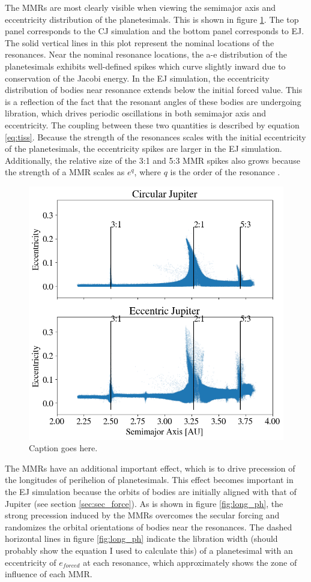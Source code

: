 \documentclass[onecolumn]{aastex63}
\begin{document}
The MMRs are most clearly visible when viewing the semimajor axis and eccentricity distribution of the planetesimals. This is shown 
in figure \ref{fig:ae}. The top panel corresponds to the CJ simulation and the bottom panel corresponds to EJ. The solid vertical lines 
in this plot represent the nominal locations of the resonances. Near the nominal resonance locations, the a-e distribution of the 
planetesimals exhibits well-defined spikes which curve slightly inward due to conservation of the Jacobi energy. In the EJ simulation, 
the eccentricity distribution of bodies near resonance extends below the initial forced value. This is a reflection of the fact that the resonant 
angles of these bodies are undergoing libration, which drives periodic oscillations in both semimajor axis and eccentricity. The coupling 
between these two quantities is described by equation \ref{eq:tiss}. Because the strength of the resonances scales with the initial 
eccentricity of the planetesimals, the eccentricity spikes are larger in the EJ simulation. Additionally, the relative size of the 3:1 and 5:3 
MMR spikes also grows because the strength of a MMR scales as $e^{q}$, where $q$ is the order of the resonance 
\citep{1994PhyD...77..289M}.

\begin{figure}
    \begin{center}
    \includegraphics[width=0.4\columnwidth]{figures/ae.png}
    \caption{Caption goes here.\label{fig:ae}}
    \end{center}
\end{figure}

The MMRs have an additional important effect, which is to drive precession of the longitudes of perihelion of planetesimals. 
This effect becomes important in the EJ simulation because the orbits of bodies are initially aligned with that of Jupiter 
(see section \ref{sec:sec_force}). As is shown in figure \ref{fig:long_ph}, the strong precession induced by the MMRs overcomes the 
secular forcing and randomizes the orbital orientations of bodies near the resonances. The dashed horizontal lines in figure 
\ref{fig:long_ph} indicate the libration width (should probably show the equation I used to calculate this) of a planetesimal with an 
eccentricity of $e_{forced}$ at each resonance, which approximately shows the zone of influence of each MMR.
\end{document}
